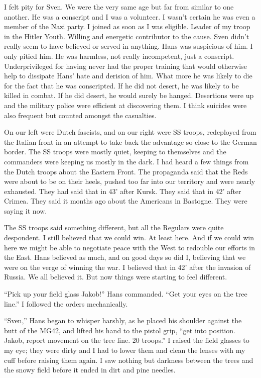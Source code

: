 \documentclass[14pt,a4paper]{memoir}
\begin{document}
I felt pity for Sven. We were the very same age but far from similar to one another. He was a conscript and I was a volunteer. I wasn’t certain he was even a member of the Nazi party. I joined as soon as I was eligible. Leader of my troop in the Hitler Youth. Willing and energetic contributor to the cause. Sven didn’t really seem to have believed or served in anything. Hans was suspicious of him. I only pitied him. He was harmless, not really incompetent, just a conscript. Underprivileged for having never had the proper training that would otherwise help to dissipate Hans’ hate and derision of him. What more he was likely to die for the fact that he was conscripted. If he did not desert, he was likely to be killed in combat. If he did desert, he would surely be hanged. Desertions were up and the military police were efficient at discovering them. I think suicides were also frequent but counted amongst the casualties.

On our left were Dutch fascists, and on our right were SS troops, redeployed from the Italian front in an attempt to take back the advantage so close to the German border. The SS troops were mostly quiet, keeping to themselves and the commanders were keeping us mostly in the dark. I had heard a few things from the Dutch troops about the Eastern Front. The propaganda said that the Reds were about to be on their heels, pushed too far into our territory and were nearly exhausted. They had said that in 43’ after Kursk. They said that in 42’ after Crimea. They said it months ago about the Americans in Bastogne. They were saying it now.

The SS troops said something different, but all the Regulars were quite despondent. I still believed that we could win. At least here. And if we could win here we might be able to negotiate peace with the West to redouble our efforts in the East. Hans believed as much, and on good days so did I, believing that we were on the verge of winning the war. I believed that in 42’ after the invasion of Russia. We all believed it. But now things were starting to feel different.

“Pick up your field glass Jakob!” Hans commanded. “Get your eyes on the tree line.” I followed the orders mechanically.

“Sven,” Hans began to whisper harshly, as he placed his shoulder against the butt of the MG42, and lifted his hand to the pistol grip, “get into position. Jakob, report movement on the tree line. 20 troops.” I raised the field glasses to my eye; they were dirty and I had to lower them and clean the lenses with my cuff before raising them again. I saw nothing but darkness between the trees and the snowy field before it ended in dirt and pine needles.
\end{document}
